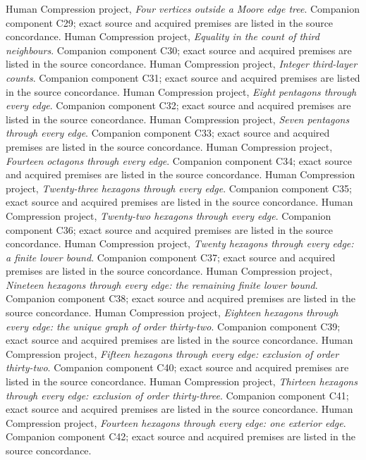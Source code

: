  Human Compression project, \emph{Four vertices outside a Moore edge tree}. Companion component C29; exact source and acquired premises are listed in the source concordance.
 Human Compression project, \emph{Equality in the count of third neighbours}. Companion component C30; exact source and acquired premises are listed in the source concordance.
 Human Compression project, \emph{Integer third-layer counts}. Companion component C31; exact source and acquired premises are listed in the source concordance.
 Human Compression project, \emph{Eight pentagons through every edge}. Companion component C32; exact source and acquired premises are listed in the source concordance.
 Human Compression project, \emph{Seven pentagons through every edge}. Companion component C33; exact source and acquired premises are listed in the source concordance.
 Human Compression project, \emph{Fourteen octagons through every edge}. Companion component C34; exact source and acquired premises are listed in the source concordance.
 Human Compression project, \emph{Twenty-three hexagons through every edge}. Companion component C35; exact source and acquired premises are listed in the source concordance.
 Human Compression project, \emph{Twenty-two hexagons through every edge}. Companion component C36; exact source and acquired premises are listed in the source concordance.
 Human Compression project, \emph{Twenty hexagons through every edge: a finite lower bound}. Companion component C37; exact source and acquired premises are listed in the source concordance.
 Human Compression project, \emph{Nineteen hexagons through every edge: the remaining finite lower bound}. Companion component C38; exact source and acquired premises are listed in the source concordance.
 Human Compression project, \emph{Eighteen hexagons through every edge: the unique graph of order thirty-two}. Companion component C39; exact source and acquired premises are listed in the source concordance.
 Human Compression project, \emph{Fifteen hexagons through every edge: exclusion of order thirty-two}. Companion component C40; exact source and acquired premises are listed in the source concordance.
 Human Compression project, \emph{Thirteen hexagons through every edge: exclusion of order thirty-three}. Companion component C41; exact source and acquired premises are listed in the source concordance.
 Human Compression project, \emph{Fourteen hexagons through every edge: one exterior edge}. Companion component C42; exact source and acquired premises are listed in the source concordance.
